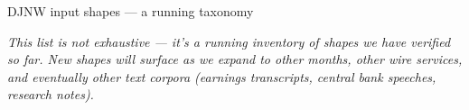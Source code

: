 \documentclass[10pt,aspectratio=169]{beamer}
\begin{document}
\begin{frame}{DJNW input shapes --- a running taxonomy}
  \vspace{0.3em}
  \raggedright
  \emph{This list is not exhaustive --- it's a running inventory of shapes we have verified
  so far. New shapes will surface as we expand to other months, other wire services, and
  eventually other text corpora (earnings transcripts, central bank speeches, research notes).}
\end{frame}
\end{document}
